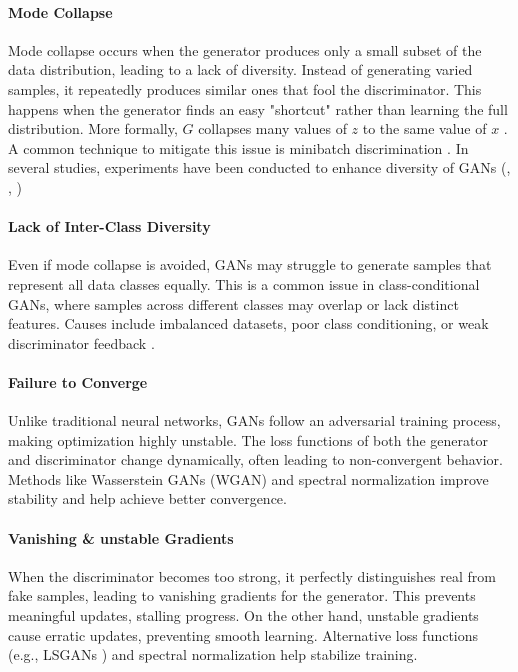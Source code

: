 \paragraph[Mode Collapse]{Mode Collapse}
Mode collapse occurs when the generator produces only a small subset of the data distribution, leading to a lack of diversity. Instead of generating varied samples, it repeatedly produces similar ones that fool the discriminator. This happens when the generator finds an easy "shortcut" rather than learning the full distribution. More formally, \(G\) collapses many values of \(z\) to the same value of \(x\) \cite{goodfellow2014generativeadversarialnetworks}. A common technique to mitigate this issue is  minibatch discrimination \cite{salimans2016improvedtechniquestraininggans}. In several studies, experiments have been conducted to enhance diversity of GANs (\cite{Chang2024QDGenSampling}, \cite{Humayun2021MaGNET}, \cite{Humayun2022PolaritySampling}) %
\paragraph[Lack of Inter-Class Diversity]{Lack of Inter-Class Diversity}
Even if mode collapse is avoided, GANs may struggle to generate samples that represent all data classes equally. This is a common issue in class-conditional GANs, where samples across different classes may overlap or lack distinct features. Causes include imbalanced datasets, poor class conditioning, or weak discriminator feedback \cite{Odena201710.5555/3305890.3305954}.
\paragraph[Failure to Converge]{Failure to Converge}
Unlike traditional neural networks, GANs follow an adversarial training process, making optimization highly unstable. The loss functions of both the generator and discriminator change dynamically, often leading to non-convergent behavior. Methods like Wasserstein GANs (WGAN) \cite{arjovsky2017wassersteingan} and spectral normalization \cite{miyato2018spectralnormalizationgenerativeadversarial} improve stability and help achieve better convergence.
\paragraph[Vanishing & unstable Gradients]{Vanishing \& unstable Gradients}
When the discriminator becomes too strong, it perfectly distinguishes real from fake samples, leading to vanishing gradients for the generator. This prevents meaningful updates, stalling progress. On the other hand, unstable gradients cause erratic updates, preventing smooth learning. Alternative loss functions (e.g., LSGANs \cite{mao2017squaresgenerativeadversarialnetworks}) and spectral normalization help stabilize training.
